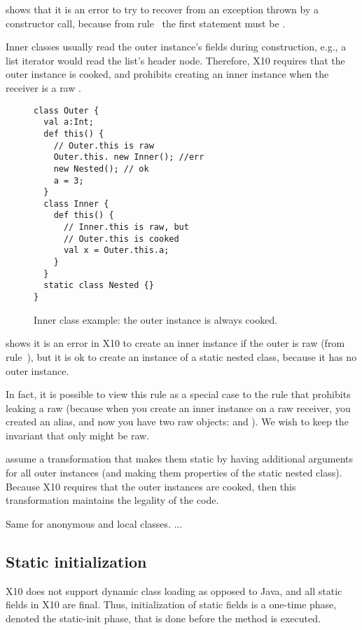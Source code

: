  shows that it is an error to try to recover from an exception thrown
    by a constructor call, because from rule~ the first statement must be .


Inner classes usually read the outer instance's fields during construction,
    e.g., a list iterator would read the list's header node.
Therefore, X10 requires that the outer instance is cooked,
    and prohibits creating an inner instance when the receiver is a raw \this.


\begin{figure}
\begin{lstlisting}
class Outer {
  val a:Int;
  def this() {
    // Outer.this is raw
    Outer.this. new Inner(); //err
    new Nested(); // ok
    a = 3;
  }
  class Inner {
    def this() {
      // Inner.this is raw, but
      // Outer.this is cooked
      val x = Outer.this.a;
    }
  }
  static class Nested {}
}
\end{lstlisting}
\caption{Inner class example: the outer instance is always cooked.
    }
\label{Figure:InnerClass}
\end{figure}

 shows it is an error in X10 to create an inner instance
    if the outer is raw (from rule~),
    but it is ok to create an instance of a static nested class,
    because it has no outer instance.

In fact, it is possible to view this rule as a special case to the rule that
    prohibits leaking a raw \this
    (because when you create an inner instance on a raw \this receiver,
    you created an alias,
    and now you have two raw objects:  and ).
We wish to keep the invariant that only \this might be raw.


assume a transformation that makes them static by having additional arguments for all outer instances (and making them properties of the static nested class).
Because X10 requires that the outer instances are cooked, then this transformation maintains the legality of the code.

Same for anonymous and local classes. \todo ...


\subsection{Static initialization}
X10 does not support dynamic class loading as opposed to Java,
    and all static fields in X10 are final.
Thus, initialization of static fields is a one-time phase, denoted the static-init phase,
    that is done before the  method is executed.

